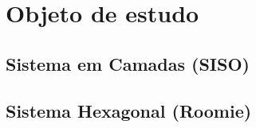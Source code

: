\chapter{Objeto de estudo}
\label{cap:objeto-de-estudo}

\section{Sistema em Camadas (SISO)}
\label{sec:siso}

\section{Sistema Hexagonal (Roomie)}
\label{sec:roomie}